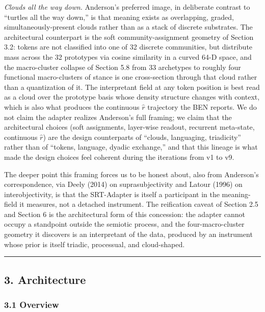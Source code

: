 \documentclass[
  11pt]{article}
\begin{document}
\emph{Clouds all the way down.} Anderson's preferred image, in
deliberate contrast to ``turtles all the way down,'' is that meaning
exists as overlapping, graded, simultaneously-present clouds rather than
as a stack of discrete substrates. The architectural counterpart is the
soft community-assignment geometry of Section 3.2: tokens are not
classified into one of 32 discrete communities, but distribute mass
across the 32 prototypes via cosine similarity in a curved 64-D space,
and the macro-cluster collapse of Section 5.8 from 33 archetypes to
roughly four functional macro-clusters of stance is one cross-section
through that cloud rather than a quantization of it. The interpretant
field at any token position is best read as a cloud over the prototype
basis whose density structure changes with context, which is also what
produces the continuous \(\hat{r}\) trajectory the BEN reports. We do
not claim the adapter realizes Anderson's full framing; we claim that
the architectural choices (soft assignments, layer-wise readout,
recurrent meta-state, continuous \(\hat{r}\)) are the design
counterparts of ``clouds, languaging, triadicity'' rather than of
``tokens, language, dyadic exchange,'' and that this lineage is what
made the design choices feel coherent during the iterations from v1 to
v9.

The deeper point this framing forces us to be honest about, also from
Anderson's correspondence, via Deely (2014) on suprasubjectivity and
Latour (1996) on interobjectivity, is that the SRT-Adapter is itself a
participant in the meaning-field it measures, not a detached instrument.
The reification caveat of Section 2.5 and Section 6 is the architectural
form of this concession: the adapter cannot occupy a standpoint outside
the semiotic process, and the four-macro-cluster geometry it discovers
is an interpretant of the data, produced by an instrument whose prior is
itself triadic, processual, and cloud-shaped.

\begin{center}\rule{0.5\linewidth}{0.5pt}\end{center}

\subsection{3. Architecture}\label{architecture}

\subsubsection{3.1 Overview}\label{overview}
\end{document}
